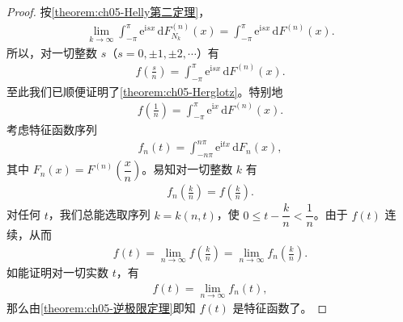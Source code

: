 \documentclass[../../main.tex]{subfiles}
\begin{document}
\begin{proof}
按\cref{theorem:ch05-Helly第二定理}，
\begin{align*}
\lim_{k\to\infty}\int_{-\pi}^{\pi}\mathrm{e}^{\mathrm{i}sx}\,\mathrm{d}F_{N_k}^{(n)}(x)=\int_{-\pi}^{\pi}\mathrm{e}^{\mathrm{i}sx}\,\mathrm{d}F^{(n)}(x).
\end{align*}
所以，对一切整数 $s$（$s=0,\pm1,\pm2,\cdots$）有
\begin{align*}
f\!\left(\frac{s}{n}\right)=\int_{-\pi}^{\pi}\mathrm{e}^{\mathrm{i}sx}\,\mathrm{d}F^{(n)}(x).
\end{align*}
至此我们已顺便证明了\cref{theorem:ch05-Herglotz}。特别地
\begin{align}
f\!\left(\frac1n\right)=\int_{-\pi}^{\pi}\mathrm{e}^{\mathrm{i}x}\,\mathrm{d}F^{(n)}(x).
\end{align}
考虑特征函数序列
\begin{align*}
f_n(t)=\int_{-n\pi}^{n\pi}\mathrm{e}^{\mathrm{i}tx}\,\mathrm{d}F_n(x),
\end{align*}
其中 $F_n(x)=F^{(n)}\!\left(\dfrac{x}{n}\right)$。易知对一切整数 $k$ 有
\begin{align}
f_n\!\left(\frac{k}{n}\right)=f\!\left(\frac{k}{n}\right).
\end{align}
对任何 $t$，我们总能选取序列 $k=k(n,t)$，使 $0\leqslant t-\dfrac{k}{n}<\dfrac1n$。由于 $f(t)$ 连续，从而
\begin{align}
f(t)=\lim_{n\to\infty}f\!\left(\frac{k}{n}\right)=\lim_{n\to\infty}f_n\!\left(\frac{k}{n}\right).
\end{align}
如能证明对一切实数 $t$，有
\begin{align}
f(t)=\lim_{n\to\infty}f_n(t),
\end{align}
那么由\cref{theorem:ch05-逆极限定理}即知 $f(t)$ 是特征函数了。


\end{proof}
\end{document}
